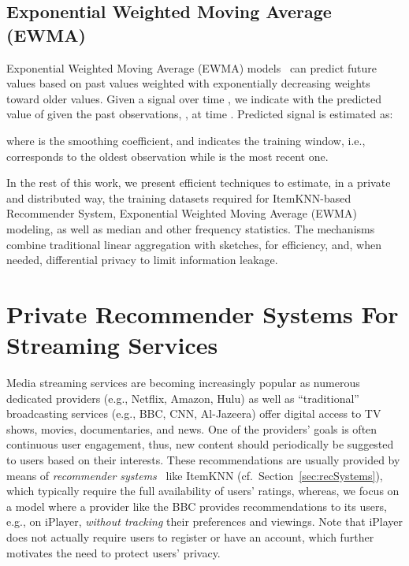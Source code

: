 \documentclass[conference]{IEEEtran}
\begin{document}
\subsection{Exponential Weighted Moving Average (EWMA)}
\label{sec:timePred}

Exponential Weighted Moving Average (EWMA) models~\cite{soldo2010predictive} can predict future values based on past values weighted with exponentially decreasing weights toward older values.
Given a signal over time , we indicate with  the predicted value of  given the past observations, , at time . 
Predicted signal  is estimated as: \vspace{-0.15cm}

where  is the smoothing coefficient, and 
indicates the training window, i.e.,  corresponds to the oldest observation while  is the most recent one.

\vspace{3mm}

In the rest of this work, we present efficient techniques to estimate, in a private and distributed way, the training datasets required for ItemKNN-based Recommender System, Exponential Weighted Moving Average (EWMA) modeling, as well as median and other frequency statistics. The mechanisms combine traditional linear aggregation with sketches, for efficiency, and, when needed, differential privacy to limit information leakage.

\section{Private Recommender Systems For\\ Streaming Services}
\label{sec:service}
Media streaming services are becoming increasingly popular as numerous dedicated providers (e.g., Netflix, Amazon, Hulu) as well as ``traditional'' broadcasting services (e.g., BBC, CNN, Al-Jazeera) offer digital access to TV shows, movies, documentaries, and news.
One of the providers' goals is often continuous user engagement, thus, new content should periodically be suggested to users based on their interests. 
These recommendations are usually provided by means of {\em recommender systems}~\cite{herlocker2004evaluating, adomavicius2005toward} like ItemKNN (cf.~Section~\ref{sec:recSystems}), which typically require the full availability of users' ratings, whereas, we focus on a model where a provider like the BBC provides recommendations to its users, e.g., on iPlayer, {\em without tracking} their preferences and viewings. Note that iPlayer does not actually require users to register or have an account, which further motivates the need to protect users' privacy.
\end{document}
